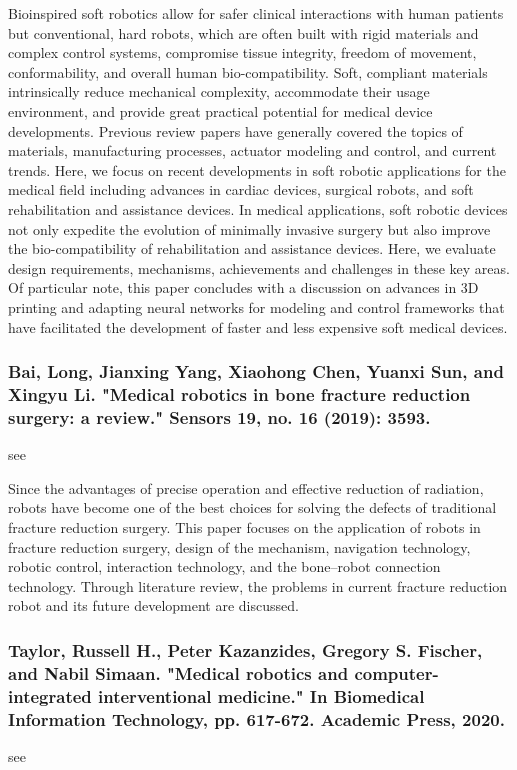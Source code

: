 \documentclass[conference]{IEEEtran}
\begin{document}
Bioinspired soft robotics allow for safer clinical interactions with human patients but conventional, hard robots, which are often built with rigid materials and complex control systems, compromise tissue integrity, freedom of movement, conformability, and overall human bio-compatibility. Soft, compliant materials intrinsically reduce mechanical complexity, accommodate their usage environment, and provide great practical potential for medical device developments. Previous review papers have generally covered the topics of materials, manufacturing processes, actuator modeling and control, and current trends. Here, we focus on recent developments in soft robotic applications for the medical field including advances in cardiac devices, surgical robots, and soft rehabilitation and assistance devices. In medical applications, soft robotic devices not only expedite the evolution of minimally invasive surgery but also improve the bio-compatibility of rehabilitation and assistance devices. Here, we evaluate design requirements, mechanisms, achievements and challenges in these key areas. Of particular note, this paper concludes with a discussion on advances in 3D printing and adapting neural networks for modeling and control frameworks that have facilitated the development of faster and less expensive soft medical devices.

\medskip
\subsubsection{Bai, Long, Jianxing Yang, Xiaohong Chen, Yuanxi Sun, and Xingyu Li. "Medical robotics in bone fracture reduction surgery: a review." Sensors 19, no. 16 (2019): 3593.}
see \cite{bai2019medical}

Since the advantages of precise operation and effective reduction of radiation, robots have become one of the best choices for solving the defects of traditional fracture reduction surgery. This paper focuses on the application of robots in fracture reduction surgery, design of the mechanism, navigation technology, robotic control, interaction technology, and the bone–robot connection technology. Through literature review, the problems in current fracture reduction robot and its future development are discussed.

\medskip
\subsubsection{Taylor, Russell H., Peter Kazanzides, Gregory S. Fischer, and Nabil Simaan. "Medical robotics and computer-integrated interventional medicine." In Biomedical Information Technology, pp. 617-672. Academic Press, 2020.}
see \cite{taylor2020medical}
\end{document}
